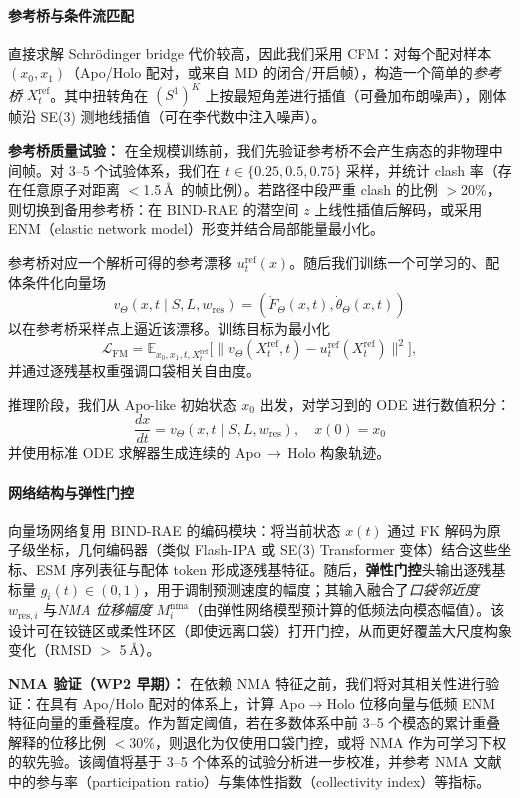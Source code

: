 \documentclass[11pt,a4paper,fontset=fandol]{ctexart}
\begin{document}
\paragraph{参考桥与条件流匹配}
直接求解 Schrödinger bridge 代价较高，因此我们采用 CFM：对每个配对样本 $(x_0, x_1)$（Apo/Holo 配对，或来自 MD 的闭合/开启帧），构造一个简单的\emph{参考桥} $X_t^{\text{ref}}$。其中扭转角在 $(S^1)^K$ 上按最短角差进行插值（可叠加布朗噪声），刚体帧沿 SE(3) 测地线插值（可在李代数中注入噪声）。

\textbf{参考桥质量试验：} 在全规模训练前，我们先验证参考桥不会产生病态的非物理中间帧。对 3--5 个试验体系，我们在 $t \in \{0.25, 0.5, 0.75\}$ 采样，并统计 clash 率（存在任意原子对距离 $<$1.5\,\AA\ 的帧比例）。若路径中段严重 clash 的比例 $>$20\%，则切换到备用参考桥：在 BIND-RAE 的潜空间 $z$ 上线性插值后解码，或采用 ENM（elastic network model）形变并结合局部能量最小化。

参考桥对应一个解析可得的参考漂移 $u_t^{\text{ref}}(x)$。随后我们训练一个可学习的、配体条件化向量场
    \[
    v_\Theta(x,t \mid S, L, w_{\text{res}}) = (\dot F_\Theta(x,t), \dot\theta_\Theta(x,t))
    \]
    以在参考桥采样点上逼近该漂移。训练目标为最小化
    \[
        \mathcal{L}_{\text{FM}}
        = \mathbb{E}_{x_0,x_1,t,X_t^{\text{ref}}}
        \big[
        \| v_\Theta(X_t^{\text{ref}},t) - u_t^{\text{ref}}(X_t^{\text{ref}}) \|^2
        \big],
    \]
    并通过逐残基权重强调口袋相关自由度。

推理阶段，我们从 Apo-like 初始状态 $x_0$ 出发，对学习到的 ODE 进行数值积分：
\[
\frac{dx}{dt} = v_\Theta(x,t \mid S, L, w_{\text{res}}),\quad x(0)=x_0
\]
并使用标准 ODE 求解器生成连续的 Apo\,$\to$\,Holo 构象轨迹。

\paragraph{网络结构与弹性门控}
向量场网络复用 BIND-RAE 的编码模块：将当前状态 $x(t)$ 通过 FK 解码为原子级坐标，几何编码器（类似 Flash-IPA 或 SE(3) Transformer 变体）结合这些坐标、ESM 序列表征与配体 token 形成逐残基特征。随后，\textbf{弹性门控}头输出逐残基标量 $g_i(t)\in(0,1)$，用于调制预测速度的幅度；其输入融合了\emph{口袋邻近度} $w_{\text{res},i}$ 与\emph{NMA 位移幅度} $M_i^{\text{nma}}$（由弹性网络模型预计算的低频法向模态幅值）。该设计可在铰链区或柔性环区（即使远离口袋）打开门控，从而更好覆盖大尺度构象变化（RMSD $>$ 5\,\AA）。

\textbf{NMA 验证（WP2 早期）：} 在依赖 NMA 特征之前，我们将对其相关性进行验证：在具有 Apo/Holo 配对的体系上，计算 Apo$\to$Holo 位移向量与低频 ENM 特征向量的重叠程度。作为暂定阈值，若在多数体系中前 3--5 个模态的累计重叠解释的位移比例 $<$30\%，则退化为仅使用口袋门控，或将 NMA 作为可学习下权的软先验。该阈值将基于 3--5 个体系的试验分析进一步校准，并参考 NMA 文献中的参与率（participation ratio）与集体性指数（collectivity index）等指标。
\end{document}
